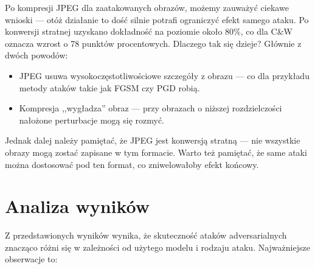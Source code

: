 \documentclass[12pt]{article}
\begin{document}
Po kompresji JPEG dla zaatakowanych obrazów, możemy zauważyć ciekawe wnioski — otóż działanie to dość silnie potrafi ograniczyć efekt samego ataku. Po konwersji stratnej uzyskano dokładność na poziomie około 80\%, co dla C\&W oznacza wzrost o 78 punktów procentowych. Dlaczego tak się dzieje? Głównie z dwóch powodów:
\begin{itemize}
    \item JPEG usuwa wysokoczęstotliwościowe szczegóły z obrazu — co dla przykładu metody ataków takie jak FGSM czy PGD robią.
    \item Kompresja ,,wygładza'' obraz — przy obrazach o niższej rozdzielczości nałożone perturbacje mogą się rozmyć.
\end{itemize}
Jednak dalej należy pamiętać, że JPEG jest konwersją stratną — nie wszystkie obrazy mogą zostać zapisane w tym formacie. Warto też pamiętać, że same ataki można dostosować pod ten format, co zniwelowałoby efekt końcowy.

\section{Analiza wyników}

Z przedstawionych wyników wynika, że skuteczność ataków adversarialnych znacząco różni się w zależności od użytego modelu i rodzaju ataku. Najważniejsze obserwacje to:
\end{document}

